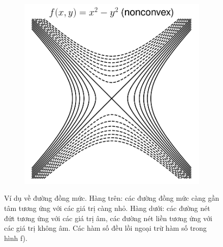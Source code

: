 \begin{figure}[t]
\begin{subfigure}{0.325\textwidth}
        \caption{}
        \label{fig:16_contourse}
    \end{subfigure}
    \begin{subfigure}{0.325\textwidth}
        \includegraphics[height=1.02\linewidth]{ebookML_src/src/convexity/hyper_2d_2.pdf}
        \caption{}
        \label{fig:16_contoursf}
    \end{subfigure}
    \caption{Ví dụ về đường đồng mức. Hàng trên: các đường đồng mức càng gần tâm tương ứng với các giá trị càng nhỏ. Hàng dưới: các đường nét đứt tương ứng với các giá trị âm, các đường nét liền tương ứng với các giá trị không âm. Các hàm số đều lồi ngoại trừ hàm số trong hình f).}
    \label{fig:16_contours}
\end{figure}
 
